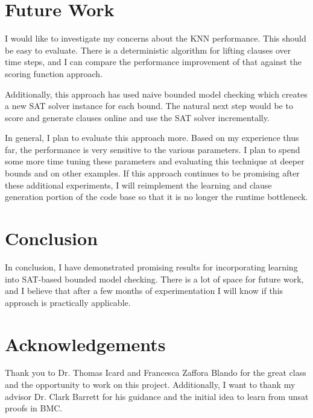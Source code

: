 \documentclass[letterpaper]{article} %
\begin{document}
\section{Future Work}

I would like to investigate my concerns about the KNN performance. This should be easy to evaluate. There is a deterministic algorithm for lifting clauses over time steps, and I can compare the performance improvement of that against the scoring function approach.

Additionally, this approach has used naive bounded model checking which creates a new SAT solver instance for each bound. The natural next step would be to score and generate clauses online and use the SAT solver incrementally.

In general, I plan to evaluate this approach more. Based on my experience thus far, the performance is very sensitive to the various parameters. I plan to spend some more time tuning these parameters and evaluating this technique at deeper bounds and on other examples. If this approach continues to be promising after these additional experiments, I will reimplement the learning and clause generation portion of the code base so that it is no longer the runtime bottleneck.

\section{Conclusion}

In conclusion, I have demonstrated promising results for incorporating learning into SAT-based bounded model checking. There is a lot of space for future work, and I believe that after a few months of experimentation I will know if this approach is practically applicable.

\section{Acknowledgements}

Thank you to Dr. Thomas Icard and Francesca Zaffora Blando for the great class and the opportunity to work on this project. Additionally, I want to thank my advisor Dr. Clark Barrett for his guidance and the initial idea to learn from unsat proofs in BMC. 



\end{document}
